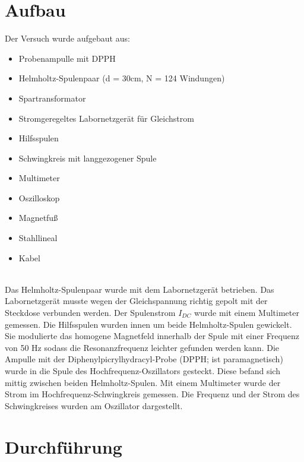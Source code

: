 \documentclass[a4paper,10pt]{scrartcl} %
\begin{document}
\section{Aufbau}
\label{sec:aufbau}
\begin{minipage}[t]{0.5\textwidth}
	Der Versuch wurde aufgebaut aus:
	\begin{itemize}
	\item Probenampulle mit DPPH
	\item Helmholtz-Spulenpaar (d = 30cm, N = 124 Windungen)
	\item Spartransformator
	\item Stromgeregeltes Labornetzgerät für Gleichstrom
	\item Hilfsspulen
	\item Schwingkreis mit langgezogener Spule
	\item Multimeter
	\item Oszilloskop
	\item Magnetfuß
	\item Stahllineal
	\item Kabel
	\end{itemize}
\end{minipage}
\hfill
\begin{minipage}[t]{0.4\textwidth}
\label{fig:Aufbau}
\end{minipage}
\\
Das Helmholtz-Spulenpaar wurde mit dem Labornetzgerät betrieben. Das Labornetzgerät musste wegen der Gleichspannung richtig gepolt mit der Steckdose verbunden werden. Der Spulenstrom $I_{DC}$ wurde mit einem Multimeter gemessen. Die Hilfsspulen wurden innen um beide Helmholtz-Spulen gewickelt. Sie modulierte das homogene Magnetfeld innerhalb der Spule mit einer Frequenz von 50 Hz sodass die Resonanzfrequenz leichter gefunden werden kann. Die Ampulle mit der Diphenylpicrylhydracyl-Probe (DPPH; ist paramagnetisch) wurde in die Spule des Hochfrequenz-Oszillators gesteckt. Diese befand sich mittig zwischen beiden Helmholtz-Spulen. Mit einem Multimeter wurde der Strom im Hochfrequenz-Schwingkreis gemessen. Die Frequenz  und der Strom des Schwingkreises wurden am Oszillator dargestellt.

\section{Durchführung}
\label{sec:durchfuehrung}
\end{document}
